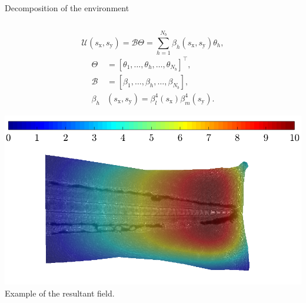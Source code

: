 \documentclass[mathserif,11pt]{beamer}
\begin{document}
\begin{frame}{Decomposition of the environment}
\begin{columns}
\begin{column}{0.5\textwidth}
\begin{equation*}
	\mathcal{U}(s_{\mathrm{x}}, s_{\mathrm{y}}) = \mathcal{B}\Theta = \sum_{h=1}^{N_b}\beta_h(s_{\mathrm{x}}, s_{\mathrm{y}})\theta_h,
	\end{equation*}
	\vspace{-0.5cm}
	\begin{subequations}
		\begin{eqnarray*}
		\Theta &= \left[\theta_1,\dots,\theta_h,\dots,\theta_{N_b}\right]^{\top},\\
		\mathcal{B} &= \left[\beta_1,\dots,\beta_h,\dots,\beta_{N_b}\right],\\
		\beta_h &(s_{\mathrm{x}}, s_{\mathrm{y}}) = \beta^{4}_{l}(s_{\mathrm{x}})\beta^{4}_{m}(s_{\mathrm{y}}).
		\end{eqnarray*}
	\end{subequations}

	\vfil
	\vspace{0.3cm}
	\includegraphics[scale=0.2]{Figures/grid_mask.png}\\
	\footnotesize{Example of the resultant field.}
\end{column}	
\end{columns}
\end{frame}
\end{document}
